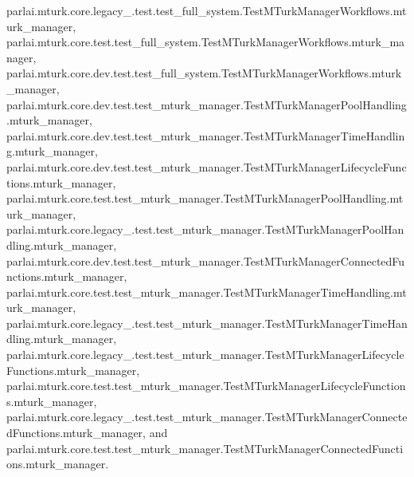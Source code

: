 parlai.\+mturk.\+core.\+legacy\+\_.\+test.\+test\+\_\+full\+\_\+system.\+Test\+M\+Turk\+Manager\+Workflows.\+mturk\+\_\+manager, parlai.\+mturk.\+core.\+test.\+test\+\_\+full\+\_\+system.\+Test\+M\+Turk\+Manager\+Workflows.\+mturk\+\_\+manager, parlai.\+mturk.\+core.\+dev.\+test.\+test\+\_\+full\+\_\+system.\+Test\+M\+Turk\+Manager\+Workflows.\+mturk\+\_\+manager, parlai.\+mturk.\+core.\+dev.\+test.\+test\+\_\+mturk\+\_\+manager.\+Test\+M\+Turk\+Manager\+Pool\+Handling.\+mturk\+\_\+manager, parlai.\+mturk.\+core.\+dev.\+test.\+test\+\_\+mturk\+\_\+manager.\+Test\+M\+Turk\+Manager\+Time\+Handling.\+mturk\+\_\+manager, parlai.\+mturk.\+core.\+dev.\+test.\+test\+\_\+mturk\+\_\+manager.\+Test\+M\+Turk\+Manager\+Lifecycle\+Functions.\+mturk\+\_\+manager, parlai.\+mturk.\+core.\+test.\+test\+\_\+mturk\+\_\+manager.\+Test\+M\+Turk\+Manager\+Pool\+Handling.\+mturk\+\_\+manager, parlai.\+mturk.\+core.\+legacy\+\_.\+test.\+test\+\_\+mturk\+\_\+manager.\+Test\+M\+Turk\+Manager\+Pool\+Handling.\+mturk\+\_\+manager, parlai.\+mturk.\+core.\+dev.\+test.\+test\+\_\+mturk\+\_\+manager.\+Test\+M\+Turk\+Manager\+Connected\+Functions.\+mturk\+\_\+manager, parlai.\+mturk.\+core.\+test.\+test\+\_\+mturk\+\_\+manager.\+Test\+M\+Turk\+Manager\+Time\+Handling.\+mturk\+\_\+manager, parlai.\+mturk.\+core.\+legacy\+\_.\+test.\+test\+\_\+mturk\+\_\+manager.\+Test\+M\+Turk\+Manager\+Time\+Handling.\+mturk\+\_\+manager, parlai.\+mturk.\+core.\+legacy\+\_.\+test.\+test\+\_\+mturk\+\_\+manager.\+Test\+M\+Turk\+Manager\+Lifecycle\+Functions.\+mturk\+\_\+manager, parlai.\+mturk.\+core.\+test.\+test\+\_\+mturk\+\_\+manager.\+Test\+M\+Turk\+Manager\+Lifecycle\+Functions.\+mturk\+\_\+manager, parlai.\+mturk.\+core.\+legacy\+\_.\+test.\+test\+\_\+mturk\+\_\+manager.\+Test\+M\+Turk\+Manager\+Connected\+Functions.\+mturk\+\_\+manager, and parlai.\+mturk.\+core.\+test.\+test\+\_\+mturk\+\_\+manager.\+Test\+M\+Turk\+Manager\+Connected\+Functions.\+mturk\+\_\+manager.

